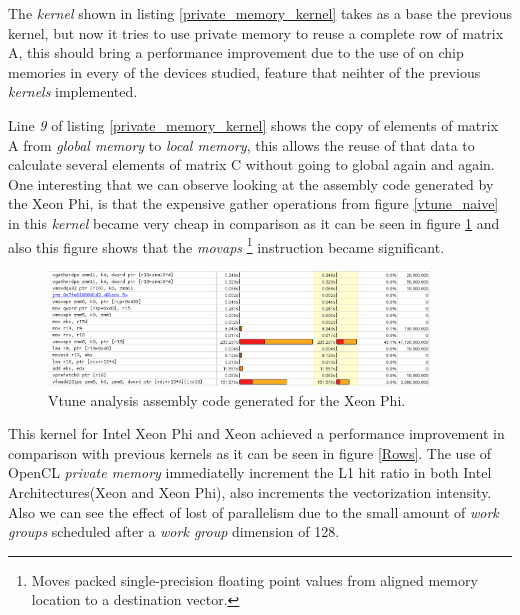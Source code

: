 \par{The \emph{kernel} shown in listing \ref{private_memory_kernel} takes as a base the previous kernel, 
    but now it tries to use private memory to reuse a complete row of matrix A, this should bring a performance improvement
    due to the use of on chip memories in every of the devices studied, feature that neihter of the previous \emph{kernels}
    implemented.}



\par{Line \emph{9} of listing \ref{private_memory_kernel} shows the copy of elements of matrix A from \emph{global memory} to
    \emph{local memory}, this allows the reuse of that data to calculate several elements of matrix C without going to global
    again and again. One interesting that we can observe looking at the assembly code generated by the Xeon Phi, is that the 
    expensive gather operations from figure \ref{vtune_naive} in this \emph{kernel} became very cheap in comparison as it can
    be seen in figure \ref{vtune_rows} and also this figure shows that the \emph{movaps} \footnote{Moves packed single-precision 
    floating point values from aligned memory location to a destination vector\cite{intrinsics}.} 
    instruction became significant.}

\begin{figure}[!h]
    \centering
    \includegraphics[width=0.9\textwidth]{figures/vtune_rows.png}
    \caption{Vtune analysis assembly code generated for the Xeon Phi.}
    \label{vtune_rows}
\end{figure}


\par{This kernel for Intel Xeon Phi and Xeon achieved a performance improvement in comparison with previous kernels as it can 
    be seen in figure \ref{Rows}. The use of OpenCL \emph{private memory} immediatelly increment the L1 hit ratio in both Intel
    Architectures(Xeon and Xeon Phi), also increments the vectorization intensity. Also we can see the effect of lost of parallelism
    due to the small amount of \emph{work groups} scheduled after a \emph{work group} dimension of 128.}

